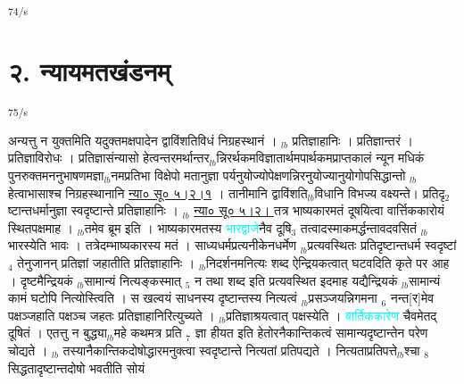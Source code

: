 \documentclass[article,12pt,a4paper]{memoir}%
\newcommand{\quotelemma}[1]{\textcolor{cyan}{#1}}
\begin{document}
	    
	    \endnumbering%
	    
	  \textsuperscript{\textenglish{74/s}}
	  
	
	    
	    \beginnumbering%
	    
	  
\chapter[{२. न्यायमतखंडनम्}][{२. न्यायमतखंडनम्}]{२. न्यायमतखंडनम्}\textsuperscript{\textenglish{75/s}}

	  
	  \pstart \leavevmode%
	अन्यत्तु न युक्तमिति \cite[8b5]{vn-msN} यदुक्तमक्षपादेन द्वाविंशतिविधं निग्रहस्थानं । {\tiny $_{lb}$} प्रतिज्ञाहानिः । प्रतिज्ञान्तरं । प्रतिज्ञाविरोधः । प्रतिज्ञासंन्यासो हेत्वन्तरमर्थान्तर{\tiny $_{lb}$}न्निरर्थकमविज्ञातार्थमपार्थकमप्राप्तकालं न्यून मधिकं पुनरुक्तमननुभाषणमज्ञा{\tiny $_{lb}$}नमप्रतिभा विक्षेपो मतानुज्ञा पर्यनुयोज्योपेक्षणन्निरनुयोज्यानुयोगोपसिद्धान्तो {\tiny $_{lb}$}हेत्वाभासाश्च निग्रहस्थानानि \href{http://sarit.indology.info/?cref=ns\%C5\%AB.5.2.1}{न्या० सू० ५।२।१} । तानीमानि द्वाविंशति{\tiny $_{lb}$}विधानि विभज्य वक्ष्यन्ते। प्रतिदृ{\tiny $_{2}$}ष्टान्तधर्मानुज्ञा स्वदृष्टान्ते प्रतिज्ञाहानिः । {\tiny $_{lb}$} \href{http://sarit.indology.info/?cref=ns\%C5\%AB.5.2.}{न्या० सू० ५।२। } तत्र भाष्यकारमतं दूषयित्वा वार्त्तिककारोयं स्थितपक्षमाह । {\tiny $_{lb}$}तमेव ब्रूम इति । भाष्यकारमतस्य \quotelemma{भारद्वाजे}नैव दूषि{\tiny $_{3}$} तत्वादस्माकमर्द्धन्तावदवसितं {\tiny $_{lb}$}भारस्येति भावः । तत्रेदम्भाष्यकारस्य मतं । साध्यधर्मप्रत्यनीकेनधर्मेण {\tiny $_{lb}$}प्रत्यवस्थितः प्रतिदृष्टान्तधर्म स्वदृष्टां {\tiny $_{4}$} तेनुजानन् प्रतिज्ञां जहातीति प्रतिज्ञाहानिः । {\tiny $_{lb}$}निदर्शनमनित्यः शब्द ऐन्द्रियकत्वात् घटवदिति कृते पर आह । दृष्टमैन्द्रियकं {\tiny $_{lb}$}सामान्यं नित्यङ्कस्मात् {\tiny $_{5}$} न तथा शब्द इति प्रत्यवस्थित इदमाह यद्यैन्द्रियकं {\tiny $_{lb}$}सामान्यं कामं घटोपि नित्योस्त्विति । स खल्वयं साधनस्य दृष्टान्तस्य नित्यत्वं {\tiny $_{lb}$}प्रसञ्जयन्निगमना {\tiny $_{6}$} नन्त[र]मेव पक्षञ्जहाति पक्षञ्च जहतः प्रतिज्ञाहानिरित्युच्यते । {\tiny $_{lb}$}प्रतिज्ञाश्रयत्वात् पक्षस्येति । \quotelemma{वार्तिककारेण} चैवमेतद् दूषितं । एतत्तु न बुद्ध्या{\tiny $_{lb}$}महे कथमत्र प्रति {\tiny $_{7}$} ज्ञा हीयत इति हेतोरनैकान्तिकत्वं सामान्यदृष्टान्तेन परेण चोद्यते । {\tiny $_{lb}$} \leavevmode{} तस्यानैकान्तिकदोषोद्धारमनुक्त्वा स्वदृष्टान्ते नित्यतां प्रतिपद्यते । नित्यताप्रतिपत्ते{\tiny $_{lb}$}श्चा {\tiny $_{8}$} सिद्धतादृष्टान्तदोषो भवतीति सोयं 
\end{document}
